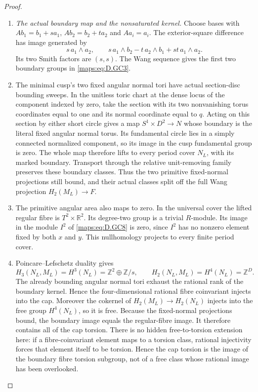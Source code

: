 \begin{proof}
\begin{enumerate}[label=\arabic*.,leftmargin=*]
\item \emph{The actual boundary map and the nonsaturated kernel.}
Choose bases with
$A b_1=b_1+s a_1$, $A b_2=b_2+t a_2$ and
$A a_i=a_i$. The exterior-square difference has
image generated by
\[
 s\,a_1\wedge a_2,\qquad
 s\,a_1\wedge b_2-t\,a_2\wedge b_1
                         +st\,a_1\wedge a_2 .
                                                        \tag{D.GC13}\label{maps:eq:D.GC13}
\]
Its two Smith factors are $(s,s)$.
The Wang sequence gives the first two boundary
groups in \eqref{maps:eq:D.GC3}.

\item The minimal cusp's two fixed angular normal
tori have actual section-disc bounding sweeps.
In the unitless toric chart at the dense locus
of the component indexed by zero, take the
section with its two nonvanishing torus
coordinates equal to one and its normal
coordinate equal to $q$. Acting on this
section by either short circle gives a map
$S^1\times D^2\to N$ whose boundary is the
literal fixed angular normal torus. Its
fundamental circle lies in a simply connected
normalized component, so its image in the
cusp fundamental group is zero. The whole
map therefore lifts to every period cover
$N_L$, with its marked boundary. Transport
through the relative unit-removing family
preserves these boundary classes. Thus the
two primitive fixed-normal projections still
bound, and their actual classes split off
the full Wang projection $H_2(M_L)\to F$.

\item The primitive angular area also maps to zero.
In the universal cover the lifted regular
fibre is $T^2\times\mathbb R^2$. Its degree-two
group is a trivial $R$-module. Its image in
the module $I^2$ of \eqref{maps:eq:D.GC8} is zero, since
$I^2$ has no nonzero element fixed by both
$x$ and $y$. This nullhomology projects to
every finite period cover.

\item Poincare--Lefschetz duality gives
\[
 H_3(N_L,M_L)=H^3(N_L)=\mathbb Z^2\oplus\mathbb Z/s,
 \qquad H_2(N_L,M_L)=H^4(N_L)=\mathbb Z^D .
                                                        \tag{D.GC14}\label{maps:eq:D.GC14}
\]
The already bounding angular normal tori exhaust
the rational rank of the boundary kernel.
Hence the four-dimensional rational fibre
coinvariant injects into the cap.
Moreover the cokernel of
$H_2(M_L)\to H_2(N_L)$ injects into the free
group $H^4(N_L)$, so it is free.
Because the fixed-normal projections bound,
the boundary image equals the regular-fibre image.
It therefore contains all of the cap torsion.
There is no hidden free-to-torsion extension
here: if a fibre-coinvariant element maps to
a torsion class, rational injectivity forces
that element itself to be torsion. Hence
the cap torsion is the image of the boundary
fibre torsion subgroup, not of a free class
whose rational image has been overlooked.


\end{enumerate}
\end{proof}
